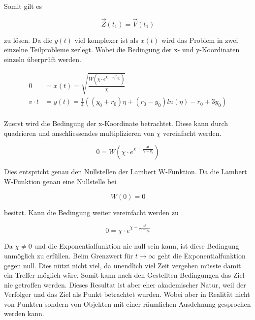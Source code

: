 Somit gilt es

\begin{equation*}
    \overrightarrow{Z}(t_1)=\overrightarrow{V}(t_1)
\end{equation*}

zu lösen. Da die $y(t)$ viel komplexer ist als $x(t)$ wird das Problem in zwei einzelne Teilprobleme zerlegt. Wobei die Bedingung der x- und y-Koordinaten einzeln überprüft werden.

\begin{align*}
    0
    &=
    x(t)
    =
    \sqrt{\frac{W\left(\chi\cdot e^{\chi-\frac{4t}{r_0-y_0}}\right)}{\chi}}
    \\
    v \cdot t
    &=
    y(t)
    =
    \frac{1}{4}\left(\left(y_0+r_0\right)\eta+\left(r_0-y_0\right)ln\left(\eta\right)-r_0+3y_0\right)
    \\
\end{align*}

Zuerst wird die Bedingung der x-Koordinate betrachtet. Diese kann durch quadrieren und anschliessendes multiplizieren von $\chi$ vereinfacht werden.

\begin{equation}
    0
    =
    W\left(\chi\cdot e^{\chi-\frac{4t}{r_0-y_0}}\right)
\end{equation}

Dies entspricht genau den Nullstellen der Lambert W-Funktion. Da die Lambert W-Funktion genau eine Nullstelle bei

\begin{equation*}
    W(0)=0
\end{equation*}

besitzt. Kann die Bedingung weiter vereinfacht werden zu

\begin{equation}
    0
    =
    \chi\cdot e^{\chi-\frac{4t}{r_0-y_0}}
\end{equation}

Da $\chi\neq0$ und die Exponentialfunktion nie null sein kann, ist diese Bedingung unmöglich zu erfüllen.
Beim Grenzwert für $t\rightarrow\infty$ geht die Exponentialfunktion gegen null.
Dies nützt nicht viel, da unendlich viel Zeit vergehen müsste damit ein Treffer möglich wäre.
Somit kann nach den Gestellten Bedingungen das Ziel nie getroffen werden.
Dieses Resultat ist aber eher akademischer Natur, weil der Verfolger und das Ziel als Punkt betrachtet wurden.
Wobei aber in Realität nicht von Punkten sondern von Objekten mit einer räumlichen Ausdehnung gesprochen werden kann.


